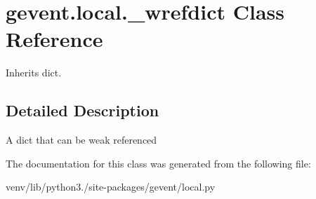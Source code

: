 \hypertarget{classgevent_1_1local_1_1__wrefdict}{}\section{gevent.\+local.\+\_\+wrefdict Class Reference}
\label{classgevent_1_1local_1_1__wrefdict}


Inherits dict.



\subsection{Detailed Description}
\begin{DoxyVerb}A dict that can be weak referenced\end{DoxyVerb}
 

The documentation for this class was generated from the following file\+:\begin{DoxyCompactItemize}
\item 
venv/lib/python3./site-\/packages/gevent/local.\+py\end{DoxyCompactItemize}
